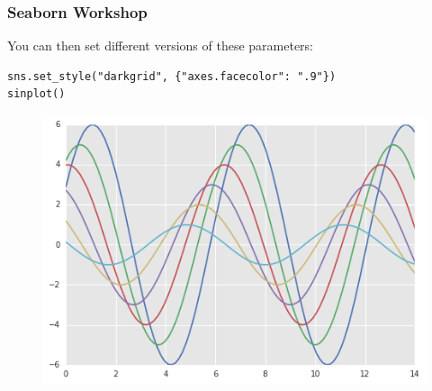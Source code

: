 \documentclass{beamer}
\begin{document}
\begin{frame}[fragile]
	\frametitle{Seaborn Workshop}
	\large
You can then set different versions of these parameters:
\begin{verbatim}
sns.set_style("darkgrid", {"axes.facecolor": ".9"})
sinplot()
\end{verbatim}

\begin{figure}
\centering
\includegraphics[width=0.7\linewidth]{images/aesthetics_31_0}
\end{figure}

\end{frame}
\end{document}
